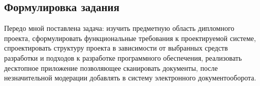 \subsection{Формулировка задания}
Передо мной поставлена задача: изучить предметную область
дипломного проекта, сформулировать функциональные требования к 
проектируемой системе, спроектировать структуру проекта в зависимости от выбранных средств разработки и подходов к разработке программного обеспечения, реализовать десктопное приложение позволяющее сканировать документы, после незначительной модерации добавлять в систему электронного документооборота.
